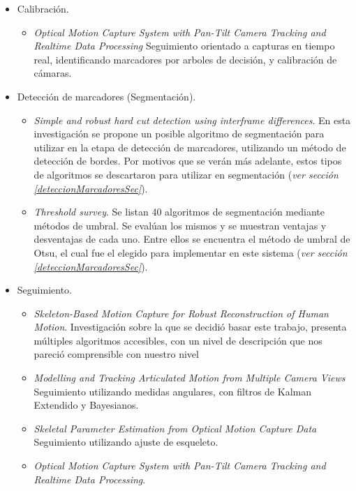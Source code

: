\begin{itemize}
	\item Calibración.
	\begin{itemize}
		\item \emph{Optical Motion Capture System with Pan-Tilt Camera Tracking and Realtime Data Processing}\cite{kurihara2002optical} Seguimiento orientado a capturas en tiempo real, identificando marcadores por arboles de decisión, y calibración de cámaras.
	\end{itemize}
	\item Detección de marcadores (Segmentación).
	\begin{itemize}
		\item \emph{Simple and robust hard cut detection using interframe differences}\cite{pardo2005simple}. En esta investigación se propone un posible algoritmo de segmentación para utilizar en la etapa de detección de marcadores, utilizando un método de detección de bordes. Por motivos que se verán más adelante, estos tipos de algoritmos se descartaron para utilizar en segmentación (\textit{ver sección \ref{deteccionMarcadoresSec}}).
		\item \emph{Threshold survey}\cite{surveyThreshold}. Se listan 40 algoritmos de segmentación mediante métodos de umbral. Se evalúan los mismos y se muestran ventajas y desventajas de cada uno. Entre ellos se encuentra el método de umbral de Otsu\cite{otsu}, el cual fue el elegido para implementar en este sistema (\textit{ver sección \ref{deteccionMarcadoresSec}}).
	\end{itemize}
	\item Seguimiento.
	\begin{itemize}
		\item \emph{Skeleton-Based Motion Capture for Robust Reconstruction of Human Motion}\cite{herda}. Investigación sobre la que se decidió basar este trabajo, presenta múltiples algoritmos accesibles, con un nivel de descripción que nos pareció comprensible con nuestro nivel
		\item \emph{Modelling and Tracking Articulated Motion from Multiple Camera Views}\cite{ringer2000modelling} Seguimiento utilizando medidas angulares, con filtros de Kalman Extendido y Bayesianos.
		\item \emph{Skeletal Parameter Estimation from Optical Motion Capture Data}\cite{kirk2005skeletal} Seguimiento utilizando ajuste de esqueleto.
		\item \emph{Optical Motion Capture System with Pan-Tilt Camera Tracking and  Realtime Data Processing}\cite{kurihara2002optical}.

\end{itemize}
\end{itemize}
